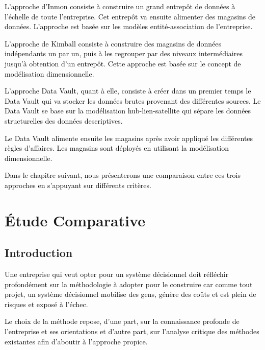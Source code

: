 \documentclass[a4paper,12pt]{report}
\begin{document}
\textcolor{black}{L’approche d’Inmon consiste à construire un grand entrepôt de données à l’échelle de toute l’entreprise. Cet entrepôt va ensuite alimenter des magasins de données. L’approche est basée sur les modèles entité-association de l’entreprise.}


\textcolor{black}{L’approche de Kimball  consiste à construire des magasins de données indépendants un par un, puis à  les  regrouper par des niveaux intermédiaires jusqu'à obtention d'un entrepôt. Cette approche est basée sur le concept de modélisation dimensionnelle.}


\textcolor{black}{L’approche Data Vault, quant à elle, consiste à créer dans un premier temps le Data Vault qui va stocker les données brutes provenant des différentes sources. Le Data Vault se base sur la modélisation hub-lien-satellite qui sépare les données structurelles des données descriptives.}


\textcolor{black}{Le Data Vault alimente ensuite les magasins après avoir appliqué les différentes règles d’affaires. Les magasins sont déployés en utilisant la modélisation dimensionnelle.}


\textcolor{black}{Dans le chapitre suivant, nous présenterons une comparaison entre ces trois approches en s’appuyant sur différents critères.}











\chapter{Étude Comparative}
\section*{Introduction}

\textcolor{black}{Une entreprise qui veut opter pour un système décisionnel doit réfléchir profondément sur la méthodologie à adopter pour le construire car comme tout projet, un système décisionnel mobilise des gens, génère des coûts et est plein de risques et exposé à l’échec.\\}

\textcolor{black}{Le choix de la méthode repose, d’une part, sur la connaissance profonde de l’entreprise et ses orientations et d’autre part, sur l’analyse critique des méthodes existantes afin d’aboutir à l’approche propice.}  \\
\end{document}
